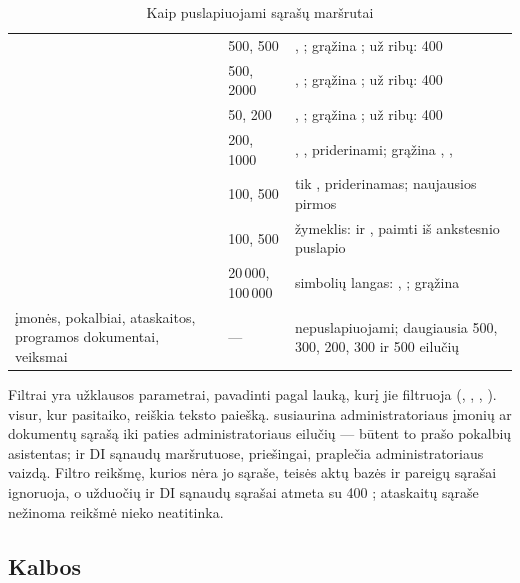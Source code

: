 \begin{table}[H]
\caption{Kaip puslapiuojami sąrašų maršrutai}\label{tab:api:paging}
\begin{tabularx}{\textwidth}{@{}L{55mm}L{27mm}Y@{}}
\toprule
{} &  &  \\
\midrule
{} & 500, 500 & , ; grąžina ; už ribų: 400 \\
 & 500, 2000 & , ; grąžina ; už ribų: 400 \\
 & 50, 200 & , ; grąžina ; už ribų: 400 \\
 & 200, 1000 & , , priderinami; grąžina , ,  \\
 & 100, 500 & tik , priderinamas; naujausios pirmos \\
 & 100, 500 & žymeklis:  ir , paimti iš ankstesnio puslapio  \\
 & 20\,000, 100\,000 & simbolių langas: , ; grąžina  \\
įmonės, pokalbiai, ataskaitos, programos dokumentai, veiksmai & --- & nepuslapiuojami; daugiausia 500, 300, 200, 300 ir 500 eilučių \\
\bottomrule
\end{tabularx}
\end{table}

Filtrai yra užklausos parametrai, pavadinti pagal lauką, kurį jie filtruoja (,
, , ).  visur, kur pasitaiko, reiškia teksto
paiešką.  susiaurina administratoriaus įmonių ar dokumentų sąrašą iki paties
administratoriaus eilučių --- būtent to prašo pokalbių asistentas;  ir
 DI sąnaudų maršrutuose, priešingai, praplečia administratoriaus vaizdą. Filtro
reikšmę, kurios nėra jo sąraše, teisės aktų bazės ir pareigų sąrašai ignoruoja, o užduočių ir DI
sąnaudų sąrašai atmeta su 400 ; ataskaitų sąraše nežinoma 
reikšmė nieko neatitinka.

\subsection{Kalbos}\label{sec:api:languages}

